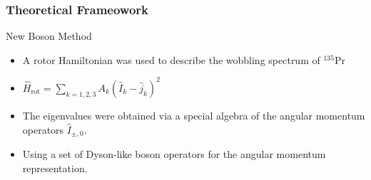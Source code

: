 \documentclass{beamer}
\begin{document}
\begin{frame}
	\frametitle{Theoretical Frameowork}

	\begin{block}{New Boson Method}
		\begin{itemize}
			\item A rotor Hamiltonian was used to describe the wobbling spectrum of $^{135}$Pr
			\item $\hat{H}_\text{rot}=\sum_{k=1,2,3}A_k\left(\hat{I}_k-\hat{j}_k\right)^2$
			\item The eigenvalues were obtained via a special algebra of the angular momentum operators $\hat{I}_{\pm,0}$.
			\item Using a set of Dyson-like boson operators for the angular momentum representation.
		\end{itemize}
	\end{block}
\end{frame}
\end{document}
